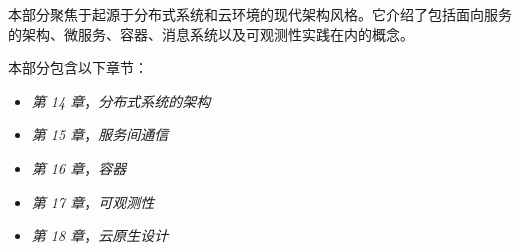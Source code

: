 本部分聚焦于起源于分布式系统和云环境的现代架构风格。它介绍了包括面向服务的架构、微服务、容器、消息系统以及可观测性实践在内的概念。

本部分包含以下章节：

\begin{itemize}
\item \emph{第 14 章}，\emph{分布式系统的架构}
\item \emph{第 15 章}，\emph{服务间通信}
\item \emph{第 16 章}，\emph{容器}
\item \emph{第 17 章}，\emph{可观测性}
\item \emph{第 18 章}，\emph{云原生设计}
\end{itemize}
